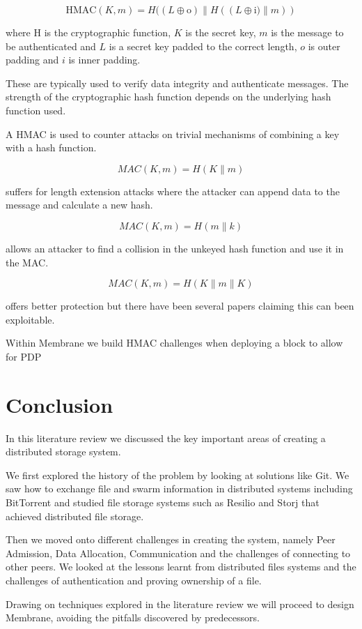 \documentclass[11pt, a4paper, twoside]{report}
\begin{document}
$$\mbox{HMAC}(K, m) = H((L \oplus \mbox{o}) \parallel H((L \oplus \mbox{i)} \parallel m))$$

where H is the cryptographic function, $K$ is the secret key, $m$ is the message to be authenticated and $L$ is a secret key padded to the correct length, $o$ is outer padding and $i$ is inner padding.

These are typically used to verify data integrity and authenticate messages. The strength of the cryptographic hash function depends on the underlying hash function used.

A HMAC is used to counter attacks on trivial mechanisms of combining a key with a hash function.

$$MAC(K, m) = H(K \parallel m)$$

suffers for length extension attacks where the attacker can append data to the message and calculate a new hash. 

$$MAC(K, m) = H(m \parallel k)$$

allows an attacker to find a collision in the unkeyed hash function and use it in the MAC. 

$$MAC(K, m) = H(K \parallel m \parallel K)$$ 

offers better protection but there have been several papers claiming this can been exploitable. \citep{bellare1996keying}

Within Membrane we build HMAC challenges when deploying a block to allow for PDP

\section{Conclusion}
In this literature review we discussed the key important areas of creating a distributed storage system.

We first explored the history of the problem by looking at solutions like Git. We saw how to exchange file and swarm information in distributed systems including BitTorrent and studied file storage systems such as Resilio and Storj that achieved distributed file storage.

Then we moved onto different challenges in creating the system, namely Peer Admission, Data Allocation, Communication and the challenges of connecting to other peers. We looked at the lessons learnt from distributed files systems and the challenges of authentication and proving ownership of a file.

Drawing on techniques explored in the literature review we will proceed to design Membrane, avoiding the pitfalls discovered by predecessors.
\end{document}

